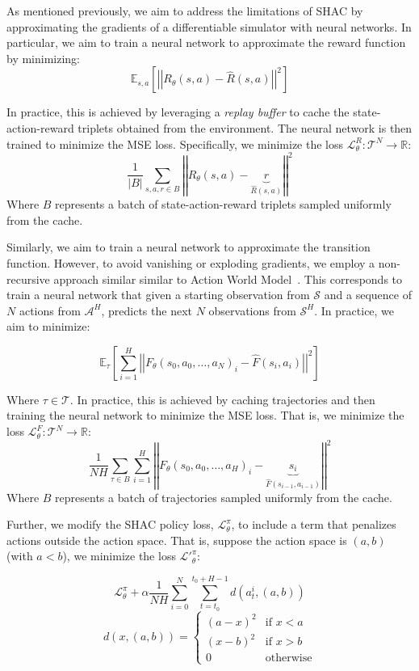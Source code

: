 As mentioned previously, we aim to address the limitations of SHAC by approximating the gradients of a differentiable simulator with neural networks. In particular, we aim to train a neural network to approximate the reward function by minimizing: 
$$ \mathbb{E}_{s,a}\left[\left|\left| R_{\theta}(s, a) - \hat{R}(s, a) \right|\right|^2\right] $$

In practice, this is achieved by leveraging a \emph{replay buffer} to cache the state-action-reward triplets obtained from the environment. The neural network is then trained to minimize the MSE loss. Specifically, we minimize the loss $\mathcal{L}_\theta^{R}:\mathcal{T}^N\rightarrow\mathbb{R}$:
$$ \frac{1}{\left|B\right|}\sum_{s,a,r \in B}\left|\left| R_\theta(s, a) - \underbrace{r}_{\hat{R}(s, a)} \right|\right|^2 $$
Where $B$ represents a batch of state-action-reward triplets sampled uniformly from the cache.

Similarly, we aim to train a neural network to approximate the transition function. However, to avoid vanishing or exploding gradients, we employ a non-recursive approach similar similar to Action World Model~\cite{Ma24}. This corresponds to train a neural network that given a starting observation from $\mathcal{S}$ and a sequence of $N$ actions from $\mathcal{A}^H$, predicts the next $N$ observations from $\mathcal{S}^H$. In practice, we aim to minimize:

$$ \mathbb{E}_{\tau}\left[\sum_{i=1}^H \left|\left| F_{\theta}(s_0, a_0, \dots, a_N)_i - \hat{F}(s_i, a_i) \right|\right|^2\right] $$

Where $\tau\in\mathcal{T}$. In practice, this is achieved by caching trajectories and then training the neural network to minimize the MSE loss. That is, we minimize the loss $\mathcal{L}_\theta^{F}:\mathcal{T}^N\rightarrow\mathbb{R}$:
$$ \frac{1}{NH}\sum_{\tau \in B}\sum_{i=1}^H\left|\left| F_{\theta}(s_0, a_0, \dots, a_H)_i - \underbrace{s_{i}}_{\hat{F}(s_{i-1}, a_{i-1})} \right|\right|^2 $$
Where $B$ represents a batch of trajectories sampled uniformly from the cache.

Further, we modify the SHAC policy loss, $\mathcal{L}_\theta^{\pi}$, to include a term that penalizes actions outside the action space. That is, suppose the action space is $(a,b)$ (with $a<b$), we minimize the loss $\mathcal{L'}_\theta^\pi:$

$$\mathcal{L}_\theta^\pi + \alpha \frac{1}{NH}\sum_{i=0}^N\sum_{t=t_0}^{t_0+H-1} d(a_t^i,(a,b))$$
$$d(x,(a,b)) = \begin{cases}(a-x)^2 & \text{if } x < a \\ (x-b)^2 & \text{if } x > b \\ 0 & \text{otherwise} \end{cases}$$

